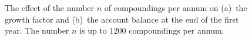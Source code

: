 \documentclass[a4paper,oneside,12pt]{article}
\begin{document}
\begin{problem}
{\begin{solution}
\begin{figure}[!htbp]
\centering
{}
\caption{%
  The effect of the number $n$ of compoundings per annum on (a)~the
  growth factor and (b)~the account balance at the end of the first
  year.  The number $n$ is up to $1200$ compoundings per annum.
}
\label{fig:e_savings_up_to_1200_compounding}
\end{figure}


\end{solution}}
\end{problem}
\end{document}
